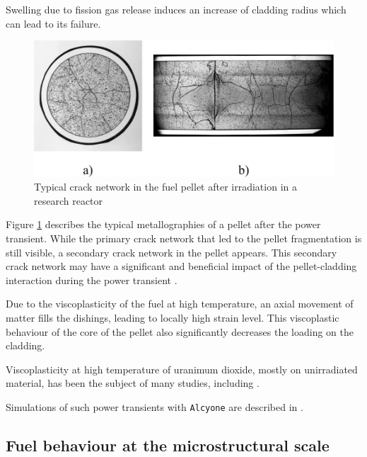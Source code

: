 Swelling due to fission gas release induces an increase of cladding
radius which can lead to its failure.


\begin{figure}[H]
  \centering
  \includegraphics[width=10.cm]{../chapter_000_introduction/figures/CrackNetwork2.pdf}
  \caption{Typical crack network in the fuel pellet after irradiation in a research reactor}
  \label{fig:hho:crack_network_2}
\end{figure}

Figure \ref{fig:hho:crack_network_2} describes the typical metallographies of
a pellet after the power transient. While the primary crack network that
led to the pellet fragmentation is still visible, a secondary crack
network in the pellet appears. This secondary crack network may have a
significant and beneficial impact of the pellet-cladding interaction
during the power transient \cite{michel_3d_2008}.

Due to the viscoplasticity of the fuel at high temperature, an axial
movement of matter fills the dishings, leading to locally high strain
level. This viscoplastic behaviour of the core of the pellet also
significantly decreases the loading on the cladding.

Viscoplasticity at high temperature of uranimum dioxide, mostly
on unirradiated material, has been the subject of many studies,
including
\cite{colin_etude_2003,monerie_overall_2006, salvo_experimental_2015, salvo_experimental_2015-1, garcia_effect_2020}.

Simulations of such power transients with \texttt{Alcyone} are described in
\cite{helfer_etude_2006, michel_3d_2008}.

\subsection{Fuel behaviour at the microstructural scale}


